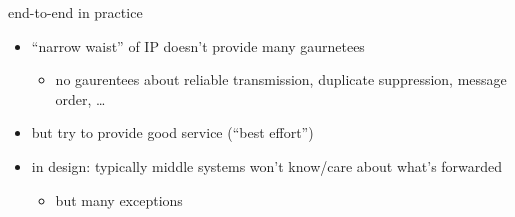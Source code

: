 
\begin{frame}{end-to-end in practice}
    \begin{itemize}
    \item ``narrow waist'' of IP doesn't provide many gaurnetees
        \begin{itemize}
        \item no gaurentees about reliable transmission, duplicate suppression, message order, \ldots
        \end{itemize}
    \item but try to provide good service (``best effort'')
    \vspace{.5cm}
    \item in design: typically middle systems won't know/care about what's forwarded
        \begin{itemize}
        \item but many exceptions
        \end{itemize}
    \end{itemize}
\end{frame}

